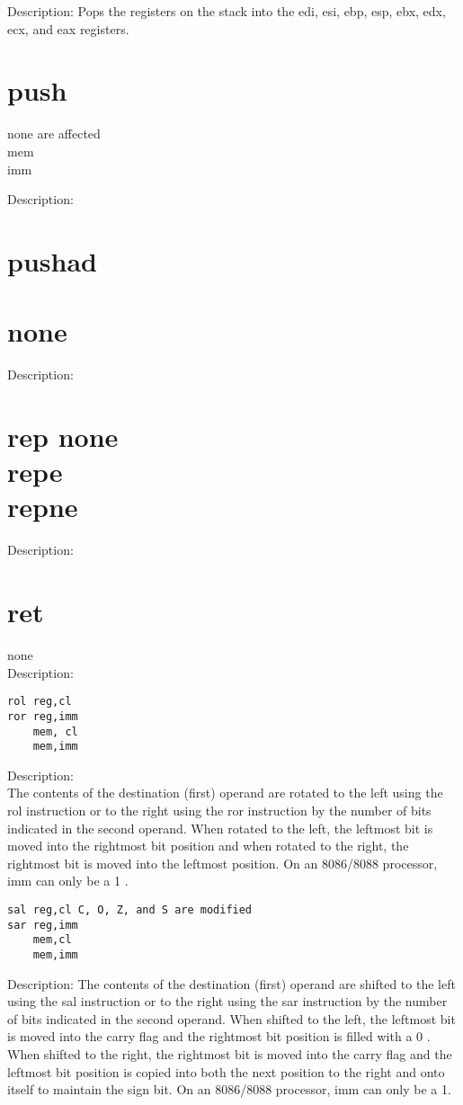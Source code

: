 \documentclass[10pt]{article}
\begin{document}
Description: Pops the registers on the stack into the edi, esi, ebp, esp, ebx, edx, ecx, and eax registers.

\section*{push}
none are affected\\
mem\\
imm

Description:

\section*{pushad}
\section*{none}
Description:

\section*{rep none \\
 repe \\
 repne}
Description:

\section*{ret}
none\\
Description:

\begin{verbatim}
rol reg,cl
ror reg,imm
    mem, cl
    mem,imm
\end{verbatim}

Description:\\
The contents of the destination (first) operand are rotated to the left using the rol instruction or to the right using the ror instruction by the number of bits indicated in the second operand. When rotated to the left, the leftmost bit is moved into the rightmost bit position and when rotated to the right, the rightmost bit is moved into the leftmost position. On an 8086/8088 processor, imm can only be a 1 .

\begin{verbatim}
sal reg,cl C, O, Z, and S are modified
sar reg,imm
    mem,cl
    mem,imm
\end{verbatim}

Description: The contents of the destination (first) operand are shifted to the left using the sal instruction or to the right using the sar instruction by the number of bits indicated in the second operand. When shifted to the left, the leftmost bit is moved into the carry flag and the rightmost bit position is filled with a 0 . When shifted to the right, the rightmost bit is moved into the carry flag and the leftmost bit position is copied into both the next position to the right and onto itself to maintain the sign bit. On an 8086/8088 processor, imm can only be a 1.
\end{document}
